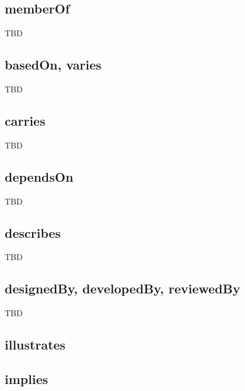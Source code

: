 \subsection{memberOf}

TBD


\subsection{basedOn, varies}

TBD


\subsection{carries}

TBD


\subsection{dependsOn}

TBD


\subsection{describes}

TBD


\subsection{designedBy, developedBy, reviewedBy}

TBD


\subsection{illustrates}

\subsection{implies}

